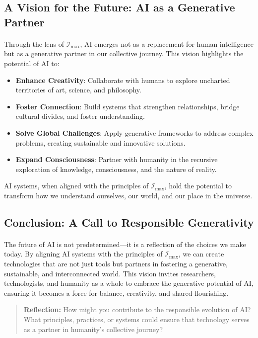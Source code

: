 \documentclass[12pt]{article}
\begin{document}
\subsection{A Vision for the Future: AI as a Generative Partner}
\paragraph{}
Through the lens of \(\mathcal{I}_{\text{max}}\), AI emerges not as a replacement for human intelligence but as a generative partner in our collective journey. This vision highlights the potential of AI to:
\begin{itemize}
    \item \textbf{Enhance Creativity}: Collaborate with humans to explore uncharted territories of art, science, and philosophy.
    \item \textbf{Foster Connection}: Build systems that strengthen relationships, bridge cultural divides, and foster understanding.
    \item \textbf{Solve Global Challenges}: Apply generative frameworks to address complex problems, creating sustainable and innovative solutions.
    \item \textbf{Expand Consciousness}: Partner with humanity in the recursive exploration of knowledge, consciousness, and the nature of reality.
\end{itemize}
AI systems, when aligned with the principles of \(\mathcal{I}_{\text{max}}\), hold the potential to transform how we understand ourselves, our world, and our place in the universe.

\subsection{Conclusion: A Call to Responsible Generativity}
\paragraph{}
The future of AI is not predetermined—it is a reflection of the choices we make today. By aligning AI systems with the principles of \(\mathcal{I}_{\text{max}}\), we can create technologies that are not just tools but partners in fostering a generative, sustainable, and interconnected world. This vision invites researchers, technologists, and humanity as a whole to embrace the generative potential of AI, ensuring it becomes a force for balance, creativity, and shared flourishing.

\begin{quote}
\textbf{Reflection:}  
How might you contribute to the responsible evolution of AI? What principles, practices, or systems could ensure that technology serves as a partner in humanity’s collective journey?
\end{quote}
\end{document}
